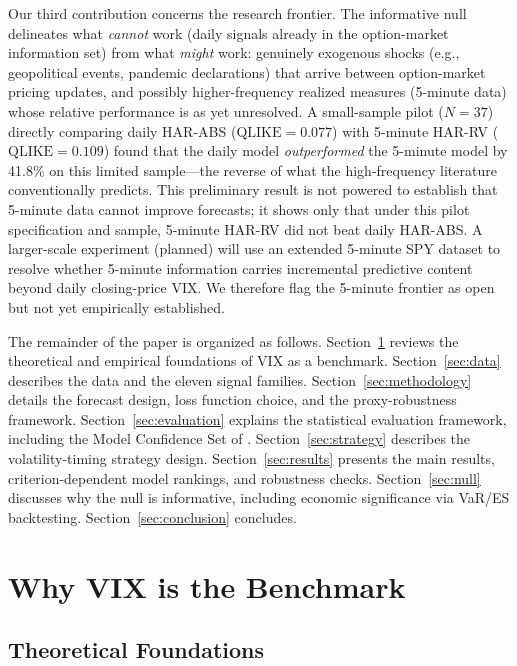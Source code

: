 \documentclass[12pt,a4paper]{article}
\begin{document}
Our third contribution concerns the research frontier. The informative null delineates what \emph{cannot} work (daily signals already in the option-market information set) from what \emph{might} work: genuinely exogenous shocks (e.g., geopolitical events, pandemic declarations) that arrive between option-market pricing updates, and possibly higher-frequency realized measures (5-minute data) whose relative performance is as yet unresolved. A small-sample pilot ($N = 37$) directly comparing daily HAR-ABS ($\text{QLIKE} = 0.077$) with 5-minute HAR-RV ($\text{QLIKE} = 0.109$) found that the daily model \emph{outperformed} the 5-minute model by 41.8\% on this limited sample---the reverse of what the high-frequency literature conventionally predicts. This preliminary result is not powered to establish that 5-minute data cannot improve forecasts; it shows only that under this pilot specification and sample, 5-minute HAR-RV did not beat daily HAR-ABS. A larger-scale experiment (planned) will use an extended 5-minute SPY dataset to resolve whether 5-minute information carries incremental predictive content beyond daily closing-price VIX. We therefore flag the 5-minute frontier as open but not yet empirically established.

The remainder of the paper is organized as follows. Section~\ref{sec:whyvix} reviews the theoretical and empirical foundations of VIX as a benchmark. Section~\ref{sec:data} describes the data and the eleven signal families. Section~\ref{sec:methodology} details the forecast design, loss function choice, and the \citet{patton2011} proxy-robustness framework. Section~\ref{sec:evaluation} explains the statistical evaluation framework, including the Model Confidence Set of \citet{hansen2011mcs}. Section~\ref{sec:strategy} describes the volatility-timing strategy design. Section~\ref{sec:results} presents the main results, criterion-dependent model rankings, and robustness checks. Section~\ref{sec:null} discusses why the null is informative, including economic significance via VaR/ES backtesting. Section~\ref{sec:conclusion} concludes.


\section{Why VIX is the Benchmark}
\label{sec:whyvix}

\subsection{Theoretical Foundations}
\end{document}
